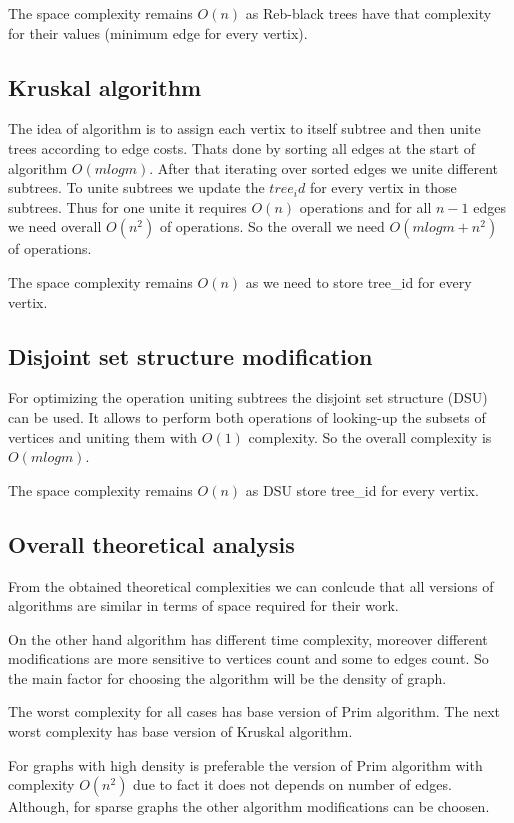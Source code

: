 The space complexity remains $O(n)$ as Reb-black trees have that complexity for their values (minimum edge for every vertix).

\subsection*{Kruskal algorithm}

The idea of algorithm is to assign each vertix to itself subtree and then unite trees according to edge costs. Thats done by
sorting all edges at the start of algorithm $O(mlogm)$. After that iterating over sorted edges we unite different subtrees. To unite subtrees we update the $tree_id$ for every vertix in those subtrees. Thus for one unite it requires $O(n)$ operations and for all $n - 1$ edges we need overall $O(n^2)$ of operations.
So the overall we need $O(mlogm + n^2)$ of operations.

The space complexity remains $O(n)$ as we need to store tree\_id for every vertix.

\subsection*{Disjoint set structure modification}

For optimizing the operation uniting subtrees the disjoint set structure (DSU) can be used. It allows to perform both operations of looking-up the subsets of vertices and uniting them with $O(1)$ complexity.
So the overall complexity is $O(mlogm)$.

The space complexity remains $O(n)$ as DSU store tree\_id for every vertix.

\subsection*{Overall theoretical analysis}

From the obtained theoretical complexities we can conlcude that all versions of algorithms are similar in terms of space required for their work.

On the other hand algorithm has different time complexity, moreover different modifications are more sensitive to vertices count and some to edges count. So the main factor for choosing the algorithm will be the density of graph.

The worst complexity for all cases has base version of Prim algorithm. The next worst complexity has base version of Kruskal algorithm.

For graphs with high density is preferable the version of Prim algorithm with complexity $O(n^2)$ due to fact it does not depends on number of edges. Although, for sparse graphs the other algorithm modifications can be choosen.

